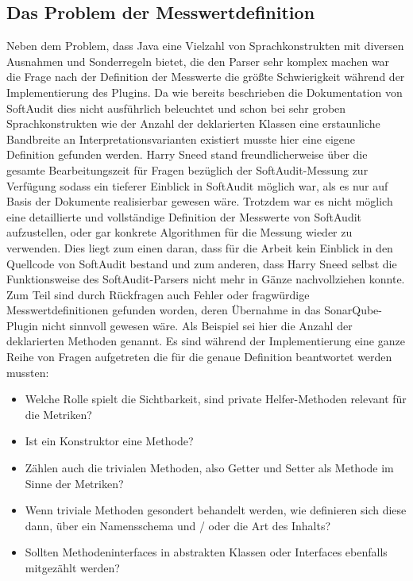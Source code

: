 \documentclass[gb,ngerman]{stthesis}
\begin{document}
  			\subsection{Das Problem der Messwertdefinition}
  				Neben dem Problem, dass Java eine Vielzahl von Sprachkonstrukten mit diversen Ausnahmen und Sonderregeln bietet, die den Parser sehr komplex machen war die Frage nach der Definition der Messwerte die größte Schwierigkeit während der Implementierung des Plugins. Da wie bereits beschrieben die Dokumentation von SoftAudit dies nicht ausführlich beleuchtet und schon bei sehr groben Sprachkonstrukten wie der Anzahl der deklarierten Klassen eine erstaunliche Bandbreite an Interpretationsvarianten existiert musste hier eine eigene Definition gefunden werden. \newline
  				Harry Sneed stand freundlicherweise über die gesamte Bearbeitungszeit für Fragen bezüglich der SoftAudit-Messung zur Verfügung sodass ein tieferer Einblick in SoftAudit möglich war, als es nur auf Basis der Dokumente realisierbar gewesen wäre. Trotzdem war es nicht möglich eine detaillierte und vollständige Definition der Messwerte von SoftAudit aufzustellen, oder gar konkrete Algorithmen für die Messung wieder zu verwenden. Dies liegt zum einen daran, dass für die Arbeit kein Einblick in den Quellcode von SoftAudit bestand und zum anderen, dass Harry Sneed selbst die Funktionsweise des SoftAudit-Parsers nicht mehr in Gänze nachvollziehen konnte. Zum Teil sind durch Rückfragen auch Fehler oder fragwürdige Messwertdefinitionen gefunden worden, deren Übernahme in das SonarQube-Plugin nicht sinnvoll gewesen wäre. \newline 
  				Als Beispiel sei hier die Anzahl der deklarierten Methoden genannt. Es sind während der Implementierung eine ganze Reihe von Fragen aufgetreten die für die genaue Definition beantwortet werden mussten:
  				\begin{itemize}
  					\item Welche Rolle spielt die Sichtbarkeit, sind private Helfer-Methoden relevant für die Metriken?
  					\item Ist ein Konstruktor eine Methode?
  					\item Zählen auch die trivialen Methoden, also Getter und Setter als Methode im Sinne der Metriken?
  					\item Wenn triviale Methoden gesondert behandelt werden, wie definieren sich diese dann, über ein Namensschema und / oder die Art des Inhalts? 
  					\item Sollten Methodeninterfaces in abstrakten Klassen oder Interfaces ebenfalls mitgezählt werden?
  				\end{itemize}
\end{document}
